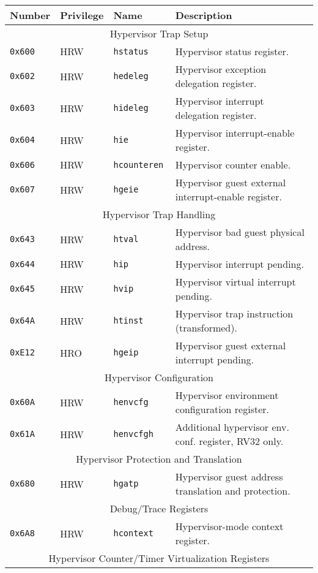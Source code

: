 \begin{table}[htb!]
\begin{center}
\begin{tabular}{|l|l|l|l|}
\hline
Number    & Privilege & Name & Description \\
\hline
\multicolumn{4}{|c|}{Hypervisor Trap Setup} \\
\hline
\hline
\tt 0x600 & HRW  &\tt hstatus    & Hypervisor status register. \\
\tt 0x602 & HRW  &\tt hedeleg    & Hypervisor exception delegation register. \\
\tt 0x603 & HRW  &\tt hideleg    & Hypervisor interrupt delegation register. \\
\tt 0x604 & HRW  &\tt hie        & Hypervisor interrupt-enable register. \\
\tt 0x606 & HRW  &\tt hcounteren & Hypervisor counter enable. \\
\tt 0x607 & HRW  &\tt hgeie      & Hypervisor guest external interrupt-enable register. \\
\hline
\multicolumn{4}{|c|}{Hypervisor Trap Handling} \\
\hline
\tt 0x643 & HRW  &\tt htval      & Hypervisor bad guest physical address. \\
\tt 0x644 & HRW  &\tt hip        & Hypervisor interrupt pending. \\
\tt 0x645 & HRW  &\tt hvip       & Hypervisor virtual interrupt pending. \\
\tt 0x64A & HRW  &\tt htinst     & Hypervisor trap instruction (transformed). \\
\tt 0xE12 & HRO  &\tt hgeip      & Hypervisor guest external interrupt pending. \\
\hline
\multicolumn{4}{|c|}{Hypervisor Configuration} \\
\hline
\tt 0x60A & HRW  &\tt henvcfg    & Hypervisor environment configuration register. \\
\tt 0x61A & HRW  &\tt henvcfgh   & Additional hypervisor env. conf. register, RV32 only. \\
\hline
\multicolumn{4}{|c|}{Hypervisor Protection and Translation} \\
\hline
\tt 0x680 & HRW  &\tt hgatp      & Hypervisor guest address translation and protection. \\
\hline
\multicolumn{4}{|c|}{Debug/Trace Registers} \\
\hline
\tt 0x6A8 & HRW &\tt hcontext & Hypervisor-mode context register. \\
\hline
\multicolumn{4}{|c|}{Hypervisor Counter/Timer Virtualization Registers} \\

\end{tabular}
\end{center}
\end{table}
